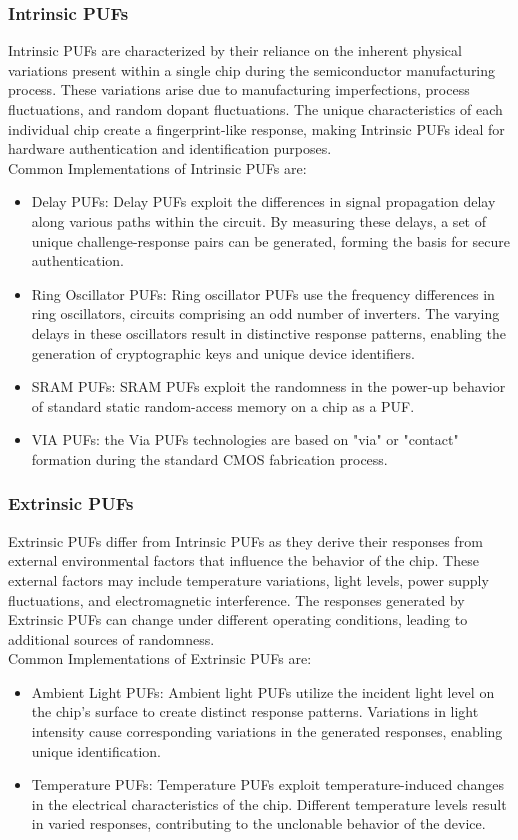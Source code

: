 \subsubsection{Intrinsic PUFs}

Intrinsic PUFs are characterized by their reliance on the inherent physical variations present within a single chip during the semiconductor manufacturing process. These variations arise due to manufacturing imperfections, process fluctuations, and random dopant fluctuations. The unique characteristics of each individual chip create a fingerprint-like response, making Intrinsic PUFs ideal for hardware authentication and identification purposes.
\\
Common Implementations of Intrinsic PUFs are:
\begin{itemize}
\item Delay PUFs: Delay PUFs exploit the differences in signal propagation delay along various paths within the circuit. By measuring these delays, a set of unique challenge-response pairs can be generated, forming the basis for secure authentication.
\item Ring Oscillator PUFs: Ring oscillator PUFs use the frequency differences in ring oscillators, circuits comprising an odd number of inverters. The varying delays in these oscillators result in distinctive response patterns, enabling the generation of cryptographic keys and unique device identifiers.
\item SRAM PUFs: SRAM PUFs exploit the randomness in the power-up behavior of standard static random-access memory on a chip as a PUF.
\item VIA PUFs: the Via PUFs technologies are based on "via" or "contact" formation during the standard CMOS fabrication process. 
\end{itemize}
\subsubsection{Extrinsic PUFs}

Extrinsic PUFs differ from Intrinsic PUFs as they derive their responses from external environmental factors that influence the behavior of the chip. These external factors may include temperature variations, light levels, power supply fluctuations, and electromagnetic interference. The responses generated by Extrinsic PUFs can change under different operating conditions, leading to additional sources of randomness.
\\
Common Implementations of Extrinsic PUFs are:
\begin{itemize}
\item Ambient Light PUFs: Ambient light PUFs utilize the incident light level on the chip's surface to create distinct response patterns. Variations in light intensity cause corresponding variations in the generated responses, enabling unique identification.
\item Temperature PUFs: Temperature PUFs exploit temperature-induced changes in the electrical characteristics of the chip. Different temperature levels result in varied responses, contributing to the unclonable behavior of the device.
\end{itemize}

